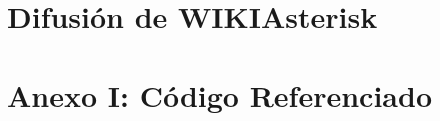 \documentclass[a4paper,11pt]{book}
\begin{document}
\chapter{Difusión de WIKIAsterisk}\label{cap:difusion}


\chapter{Anexo I: Código Referenciado}




\nocite{atdg11}
\nocite{website:voipinfo}
\nocite{website:asterisk}
\nocite{win09}


\end{document}

